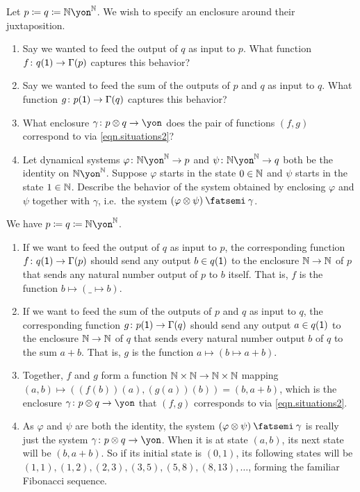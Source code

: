 \documentclass[Book-Poly]{subfiles}
\begin{document}
\begin{exercise}
Let $p\coloneqq q\coloneqq\nn\yon^\nn$.
We wish to specify an enclosure around their juxtaposition.
\begin{enumerate}
    \item Say we wanted to feed the output of $q$ as input to $p$.
    What function $f\colon q(\textsf{1})\to\Gamma(p)$ captures this behavior?
    \item Say we wanted to feed the sum of the outputs of $p$ and $q$ as input to $q$.
    What function $g\colon p(\textsf{1})\to\Gamma(q)$ captures this behavior?
    \item What enclosure $\gamma\colon p\otimes q\to\yon$ does the pair of functions $(f,g)$ correspond to via \eqref{eqn.situations2}?
	\item Let dynamical systems $\varphi\colon\nn\yon^\nn\to p$ and $\psi\colon\nn\yon^\nn\to q$ both be the identity on $\nn\yon^\nn$.
	Suppose $\varphi$ starts in the state $0\in\mathbb{N}$ and $\psi$ starts in the state $1\in\mathbb{N}$.
	Describe the behavior of the system obtained by enclosing $\varphi$ and $\psi$ together with $\gamma$, i.e.\ the system $(\varphi\otimes\psi)\then\gamma$.
\qedhere
\end{enumerate}
\begin{solution}
We have $p\coloneqq q\coloneqq\nn\yon^\nn$.
\begin{enumerate}
    \item If we want to feed the output of $q$ as input to $p$, the corresponding function $f\colon q(\textsf{1})\to\Gamma(p)$ should send any output $b\in q(\textsf{1})$ to the enclosure $\mathbb{N}\to\mathbb{N}$ of $p$ that sends any natural number output of $p$ to $b$ itself.
    That is, $f$ is the function $b\mapsto(\_\mapsto b)$.
    \item If we want to feed the sum of the outputs of $p$ and $q$ as input to $q$, the corresponding function $g\colon p(\textsf{1})\to\Gamma(q)$ should send any output $a\in q(\textsf{1})$ to the enclosure $\mathbb{N}\to\mathbb{N}$ of $q$ that sends every natural number output $b$ of $q$ to the sum $a+b$.
    That is, $g$ is the function $a\mapsto(b\mapsto a+b)$.
    \item Together, $f$ and $g$ form a function $\mathbb{N}\times\mathbb{N}\to\mathbb{N}\times\mathbb{N}$ mapping $(a,b)\mapsto((f(b))(a),(g(a))(b))=(b,a+b)$, which is the enclosure $\gamma\colon p\otimes q\to\yon$ that $(f,g)$ corresponds to via \eqref{eqn.situations2}.
    \item As $\varphi$ and $\psi$ are both the identity, the system $(\varphi\otimes\psi)\then\gamma$ is really just the system $\gamma\colon p\otimes q\to\yon$.
    When it is at state $(a,b)$, its next state will be $(b,a+b)$.
    So if its initial state is $(0,1)$, its following states will be $(1,1),(1,2),(2,3),(3,5),(5,8),(8,13),\ldots$, forming the familiar Fibonacci sequence.
\end{enumerate}
\end{solution}
\end{exercise}
\end{document}
